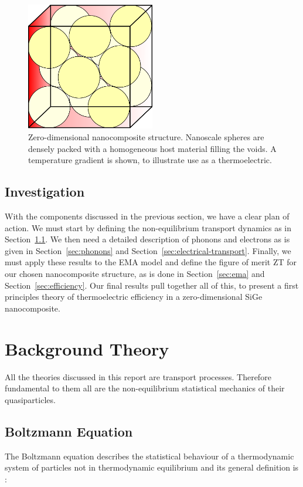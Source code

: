 \documentclass[12pt]{article}
\newcommand{\secref}[2][Section~]{#1\ref{#2}}
\begin{document}
\begin{figure}
	\centering
	\includegraphics[width=0.5\textwidth]{nanospheres-cube.eps}
	\caption{Zero-dimensional nanocomposite structure. Nanoscale spheres are densely packed with a homogeneous host material filling the voids. A temperature gradient is shown, to illustrate use as a thermoelectric.}
	\label{fig:nanospheres-cube}
\end{figure}

\subsection{Investigation}
With the components discussed in the previous section, we have a clear plan of action. We must start by defining the non-equilibrium transport dynamics as in \secref{sec:boltz}. We then need a detailed description of phonons and electrons as is given in \secref{sec:phonons} and \secref{sec:electrical-transport}. Finally, we must apply these results to the EMA model and define the figure of merit ZT for our chosen nanocomposite structure, as is done in \secref{sec:ema} and \secref{sec:efficiency}. Our final results pull together all of this, to present a first principles theory of thermoelectric efficiency in a zero-dimensional SiGe nanocomposite.

\section{Background Theory}
\label{sec:background}
All the theories discussed in this report are transport processes. Therefore fundamental to them all are the non-equilibrium statistical mechanics of their quasiparticles.

\subsection{Boltzmann Equation}
\label{sec:boltz}
The Boltzmann equation describes the statistical behaviour of a thermodynamic system of particles not in thermodynamic equilibrium and its general definition is \cite{kittel}:
\end{document}
